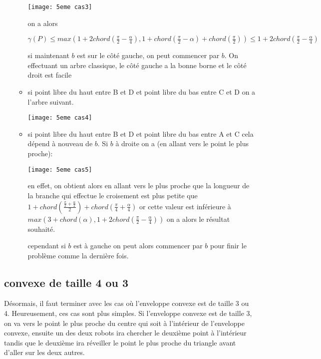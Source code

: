 \begin{itemize}
\begin{itemize}
\texttt{[image: 5eme cas3]}

on a alors

$\gamma(P) \leq max\left(1+2chord\left(\frac{\pi}{2} - \frac{\alpha}{4}\right), 1 + chord\left(\frac{\pi}{2} - \alpha\right) + chord\left(\frac{\pi}{2}\right)\right) \leq 1+2chord\left(\frac{\pi}{2} - \frac{\alpha}{4}\right)$

si maintenant $b$ est sur le côté gauche, on peut commencer par $b$. On effectuant un arbre classique, le côté gauche a la bonne borne et le côté droit est facile

\item si point libre du haut entre B et D et point libre du bas entre C et D on a l'arbre suivant.

\texttt{[image: 5eme cas4]}

\item si point libre du haut entre B et D et point libre du bas entre A et C cela dépend à nouveau de $b$. Si $b$ à droite on a (en allant vers le point le plus proche):

\texttt{[image: 5eme cas5]}

en effet, on obtient alors en allant vers le plus proche que la longueur de la branche qui effectue le croisement est plus petite que $1+chord\left(\frac{\frac{\pi}{2} + \frac{\alpha}{2}}{2}\right) + chord\left(\frac{\pi}{4} + \frac{\alpha}{4}\right)$ or cette valeur est inférieure à $max\left(3 + chord\left(\alpha\right), 1 + 2chord\left(\frac{\pi}{2} - \frac{\alpha}{4}\right)\right)$ on a alors le résultat souhaité.

cependant si $b$ est à gauche on peut alors commencer par $b$ pour finir le problème comme la dernière fois.

\end{itemize}
\end{itemize}

\subsection{convexe de taille 4 ou 3}

Désormais, il faut terminer avec les cas où l'enveloppe convexe est de taille 3 ou 4. Heureusement, ces cas sont plus simples.
Si l'enveloppe convexe est de taille 3, on va vers le point le plus proche du centre qui soit à l'intérieur de l'enveloppe convexe, ensuite un des deux robots ira chercher le deuxième point à l'intérieur tandis que le deuxième ira réveiller le point le plus proche du triangle avant d'aller sur les deux autres.

